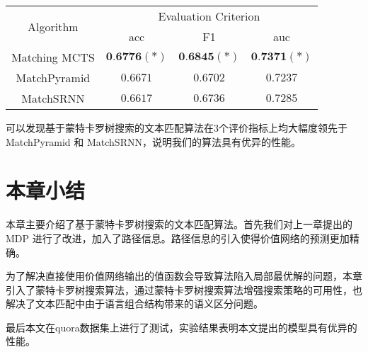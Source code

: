 \begin{table}[H]
    \label{tab:MCTS_small_test}
    \centering
    \footnotesize%
    \setlength{\tabcolsep}{4pt}%
    \renewcommand{\arraystretch}{1.2}%
    \begin{tabular}{cccc}
        \hline
        \multirow{2}{*}{Algorithm} &
        \multicolumn{3}{c}{\multirow{1}{*}{Evaluation Criterion}} \\
        \cline{2-4} & acc & F1 & auc \\
        \hline
        Matching MCTS & $\textbf{0.6776}(*)$ & $\textbf{0.6845}(*)$ & $\textbf{0.7371}(*)$ \\
        \hline
        MatchPyramid & $0.6671$ & $0.6702$ & $0.7237$ \\
        \hline
        MatchSRNN & $0.6617$ & $0.6736$ & $0.7285$\\
        \hline
    \end{tabular}
\end{table}

可以发现基于蒙特卡罗树搜索的文本匹配算法在3个评价指标上均大幅度领先于 MatchPyramid 和 MatchSRNN，说明我们的算法具有优异的性能。

\section{本章小结}
本章主要介绍了基于蒙特卡罗树搜索的文本匹配算法。首先我们对上一章提出的 MDP 进行了改进，加入了路径信息。路径信息的引入使得价值网络的预测更加精确。

为了解决直接使用价值网络输出的值函数会导致算法陷入局部最优解的问题，本章引入了蒙特卡罗树搜索算法，通过蒙特卡罗树搜索算法增强搜索策略的可用性，也解决了文本匹配中由于语言组合结构带来的语义区分问题。

最后本文在quora数据集上进行了测试，实验结果表明本文提出的模型具有优异的性能。
